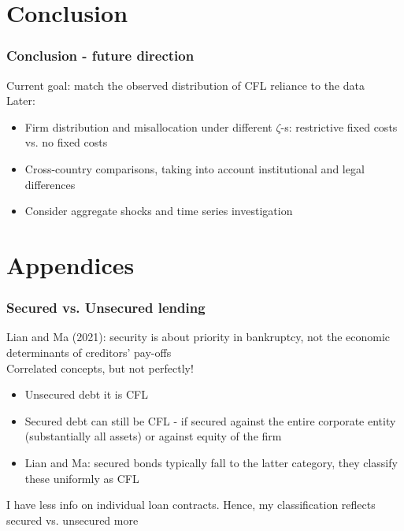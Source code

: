 \documentclass[notes]{beamer}
\begin{document}
\section{Conclusion}
\begin{frame}
\frametitle{Conclusion - future direction}

Current goal: match the observed distribution of CFL reliance to the data \vspace{5mm} \\
Later: 
\begin{itemize}
\item Firm distribution and misallocation under different $\zeta$-s: restrictive fixed costs vs. no fixed costs
\item Cross-country comparisons, taking into account institutional and legal differences
\item Consider aggregate shocks and time series investigation
\end{itemize}


\end{frame}



\section{Appendices}

\begin{frame}[label=secUnsec]
\frametitle{Secured vs. Unsecured lending}
Lian and Ma (2021): security is about priority in bankruptcy, not the economic determinants of creditors' pay-offs \vspace{5mm} \\
Correlated concepts, but not perfectly!
\begin{itemize}
\item Unsecured debt it is CFL
\item Secured debt can still be CFL - if secured against the entire corporate entity (substantially all assets) or against equity of the firm
\item Lian and Ma: secured bonds typically fall to the latter category, they classify these uniformly as CFL 
\end{itemize} \vspace{3mm} 
I have less info on individual loan contracts. Hence, my classification reflects secured vs. unsecured more
\begin{center}
\hyperlink{slide2}{}
\end{center}

\end{frame}
\end{document}
